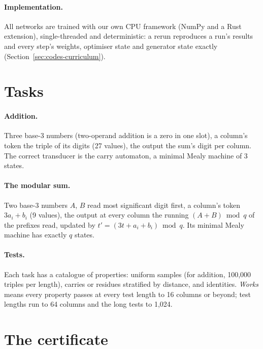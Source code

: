 \documentclass[11pt]{article}
\begin{document}
\paragraph{Implementation.} All networks are trained with our own CPU framework (NumPy and a Rust
extension), single-threaded and deterministic: a rerun reproduces a run's results and every step's
weights, optimiser state and generator state exactly (Section~\ref{sec:codes-curriculum}).

\section{Tasks}
\label{sec:tasks}

\paragraph{Addition.} Three base-3 numbers (two-operand addition is a zero in one slot), a column's
token the triple of its digits (27 values), the output the sum's digit per column. The correct
transducer is the carry automaton, a minimal Mealy machine of 3 states.

\paragraph{The modular sum.} Two base-3 numbers $A$, $B$ read most significant digit first, a
column's token $3a_i + b_i$ (9 values), the output at every column the running $(A + B) \bmod q$ of
the prefixes read, updated by $t' = (3t + a_i + b_i) \bmod q$. Its minimal Mealy machine has exactly
$q$ states.

\paragraph{Tests.} Each task has a catalogue of properties: uniform samples (for addition, 100{,}000
triples per length), carries or residues stratified by distance, and identities. \emph{Works} means
every property passes at every test length to 16 columns or beyond; test lengths run to 64 columns
and the long tests to 1{,}024.

\section{The certificate}
\label{sec:certificate}
\end{document}
